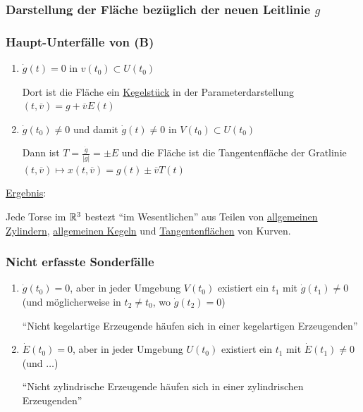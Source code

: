 \subsubsection{Darstellung der Fläche bezüglich der neuen Leitlinie \(g\)}

\subsubsection{Haupt-Unterfälle von (B)}
\begin{enumerate}
 \item[{\color{green}(Ba)}] \(\dot g(t) = 0\) in \(v(t_0) \subset U(t_0)\) \par
 Dort ist die Fläche ein \uline{Kegelstück} in der Parameterdarstellung \((t, \overline v) = g + \overline v E(t)\)
 \item[{\color{green}(Bb)}] \(\dot g(t_0) \ne 0\) und damit \(\dot g(t) \ne 0\) in \(V(t_0) \subset U(t_0)\) \par
 Dann ist \(T= \frac{\dot g}{|g|} = \pm E\) und die Fläche ist die Tangentenfläche der Gratlinie \((t, \overline v) \mapsto x(t, \overline v) = g(t) \pm \overline v T(t)\)
\end{enumerate}

\uline{Ergebnis}:

\begin{satz}\label{satz264}
 Jede Torse im \(\mathbb{R}^3\) bestezt "`im Wesentlichen"' aus Teilen von \uline{allgemeinen Zylindern}, \uline{allgemeinen Kegeln} und \uline{Tangentenflächen} von Kurven.
\end{satz}

\subsubsection{Nicht erfasste Sonderfälle}
\begin{enumerate}
 \item[{\color{magenta}(Bc)}] \(\dot g(t_0) = 0\), aber in jeder Umgebung \(V(t_0)\) existiert ein \(t_1\) mit \(\dot g(t_1) \ne 0\) (und möglicherweise in \(t_2 \ne t_0\), wo \(\dot g(t_2) = 0\)) \par
 "`Nicht kegelartige Erzeugende häufen sich in einer kegelartigen Erzeugenden"'
 \item[{\color{magenta}(Bd)}] \(\dot E(t_0) = 0\), aber in jeder Umgebung \(U(t_0)\) existiert ein \(t_1\) mit \(\dot E(t_1) \ne 0\) (und \(\dots\)) \par
 "`Nicht zylindrische Erzeugende häufen sich in einer zylindrischen Erzeugenden"'
\end{enumerate}

